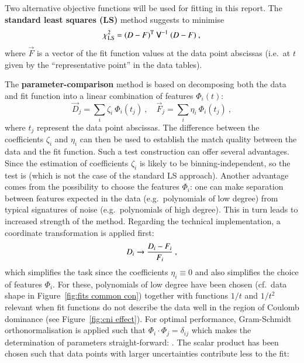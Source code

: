 
Two alternative objective functions will be used for fitting in this report. The {\bf standard least squares (LS)} method suggests to minimise
\begin{equation}
\label{eq:chi sq LS}
	\chi_{\rm LS}^2 = (\vec D - \vec F)^\T\ \mat V^{-1}\ (\vec D - \vec F)\ ,
\end{equation}
where $\vec F$ is a vector of the fit function values at the data point abscissas (i.e.~at $t$ given by the ``representative point'' in the data tables).



The {\bf parameter-comparison} method is based on decomposing both the data and fit function into a linear combination of features $\Phi_i(t)$:
\begin{equation}
\label{eq:parcmp decomposition}
	\vec D_j = \sum_i \zeta_i\ \Phi_i(t_j)\ ,\quad
	\vec F_j = \sum_i \eta_i\ \Phi_i(t_j)\ ,
\end{equation}
where $t_j$ represent the data point abscissas. The difference between the coefficients $\zeta_i$ and $\eta_i$ can then be used to establish the match quality between the data and the fit function. Such a test construction can offer several advantages. Since the estimation of coefficients $\zeta_i$ is likely to be binning-independent, so the test is (which is not the case of the standard LS approach). Another advantage comes from the possibility to choose the features $\Phi_i$: one can make separation between features expected in the data (e.g.~polynomials of low degree) from typical signatures of noise (e.g.~polynomials of high degree). This in turn leads to increased strength of the method. Regarding the technical implementation, a coordinate transformation is applied first:
\begin{equation}
\label{eq:parcmp transform}
	\vec D_i \rightarrow {\vec D_i - \vec F_i\over \vec F_i}\ ,
\end{equation}
which simplifies the task since the coefficients $\eta_i \equiv 0$ and also simplifies the choice of features $\Phi_i$. For these, polynomials of low degree have been chosen (cf.~data shape in Figure~\ref{fig:fits common con}) together with functions $1/t$ and $1/t^2$ relevant when fit functions do not describe the data well in the region of Coulomb dominance (see Figure~\ref{fig:cni effect}). For optimal performance, Gram-Schmidt orthonormalisation is applied such that $\Phi_i \cdot \Phi_j = \delta_{ij}$ which makes the determination of parameters straight-forward: . The scalar product has been chosen such that data points with larger uncertainties contribute less to the fit:
